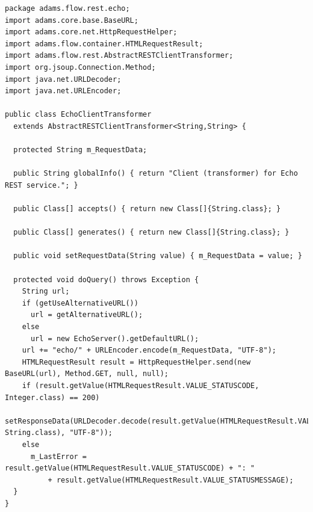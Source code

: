 \documentclass[a4paper]{book}
\begin{document}
\clearpage
{\scriptsize
\begin{verbatim}
package adams.flow.rest.echo;
import adams.core.base.BaseURL;
import adams.core.net.HttpRequestHelper;
import adams.flow.container.HTMLRequestResult;
import adams.flow.rest.AbstractRESTClientTransformer;
import org.jsoup.Connection.Method;
import java.net.URLDecoder;
import java.net.URLEncoder;

public class EchoClientTransformer
  extends AbstractRESTClientTransformer<String,String> {

  protected String m_RequestData;

  public String globalInfo() { return "Client (transformer) for Echo REST service."; }

  public Class[] accepts() { return new Class[]{String.class}; }

  public Class[] generates() { return new Class[]{String.class}; }

  public void setRequestData(String value) { m_RequestData = value; }

  protected void doQuery() throws Exception {
    String url;
    if (getUseAlternativeURL())
      url = getAlternativeURL();
    else
      url = new EchoServer().getDefaultURL();
    url += "echo/" + URLEncoder.encode(m_RequestData, "UTF-8");
    HTMLRequestResult result = HttpRequestHelper.send(new BaseURL(url), Method.GET, null, null);
    if (result.getValue(HTMLRequestResult.VALUE_STATUSCODE, Integer.class) == 200)
      setResponseData(URLDecoder.decode(result.getValue(HTMLRequestResult.VALUE_BODY, String.class), "UTF-8"));
    else
      m_LastError = result.getValue(HTMLRequestResult.VALUE_STATUSCODE) + ": "
          + result.getValue(HTMLRequestResult.VALUE_STATUSMESSAGE);
  }
}
\end{verbatim}}
\end{document}
